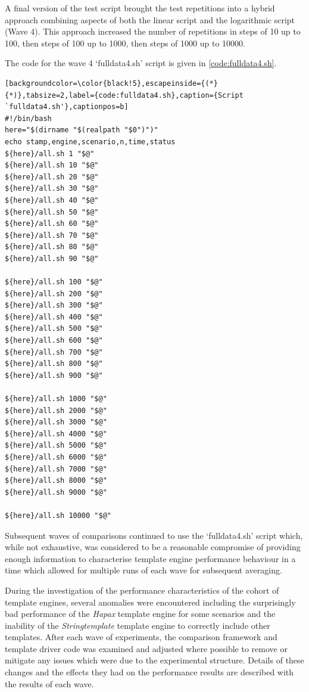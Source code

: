 A final version of the test script brought the test repetitions into a hybrid approach combining aspects of both the linear script and the logarithmic script (Wave 4). This approach increased the number of repetitions in steps of 10 up to 100, then steps of 100 up to 1000, then steps of 1000 up to 10000.

The code for the wave 4 `fulldata4.sh' script is given in \autoref{code:fulldata4.sh}.

\begin{lstlisting}[backgroundcolor=\color{black!5},escapeinside={(*}{*)},tabsize=2,label={code:fulldata4.sh},caption={Script `fulldata4.sh'},captionpos=b]
#!/bin/bash
here="$(dirname "$(realpath "$0")")"
echo stamp,engine,scenario,n,time,status
${here}/all.sh 1 "$@"
${here}/all.sh 10 "$@"
${here}/all.sh 20 "$@"
${here}/all.sh 30 "$@"
${here}/all.sh 40 "$@"
${here}/all.sh 50 "$@"
${here}/all.sh 60 "$@"
${here}/all.sh 70 "$@"
${here}/all.sh 80 "$@"
${here}/all.sh 90 "$@"

${here}/all.sh 100 "$@"
${here}/all.sh 200 "$@"
${here}/all.sh 300 "$@"
${here}/all.sh 400 "$@"
${here}/all.sh 500 "$@"
${here}/all.sh 600 "$@"
${here}/all.sh 700 "$@"
${here}/all.sh 800 "$@"
${here}/all.sh 900 "$@"

${here}/all.sh 1000 "$@"
${here}/all.sh 2000 "$@"
${here}/all.sh 3000 "$@"
${here}/all.sh 4000 "$@"
${here}/all.sh 5000 "$@"
${here}/all.sh 6000 "$@"
${here}/all.sh 7000 "$@"
${here}/all.sh 8000 "$@"
${here}/all.sh 9000 "$@"

${here}/all.sh 10000 "$@"
\end{lstlisting}

Subsequent waves of comparisons continued to use the `fulldata4.sh' script which, while not exhaustive, was considered to be a reasonable compromise of providing enough information to characterise template engine performance behaviour in a time which allowed for multiple runs of each wave for subsequent averaging.

During the investigation of the performance characteristics of the cohort of template engines, several anomalies were encountered including the surprisingly bad performance of the \emph{Hapax} template engine for some scenarios and the inability of the \emph{Stringtemplate} template engine to correctly include other templates. After each wave of experiments, the comparison framework and template driver code was examined and adjusted where possible to remove or mitigate any issues which were due to the experimental structure. Details of these changes and the effects they had on the performance results are described with the results of each wave.


